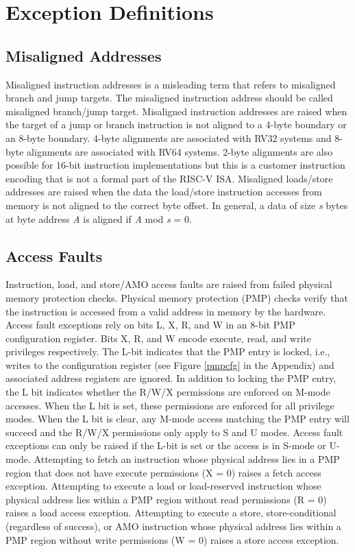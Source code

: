 \documentclass[12pt]{article}
\begin{document}
\section{Exception Definitions}
\subsection{Misaligned Addresses}
Misaligned instruction addresses is a misleading term that refers to misaligned branch and jump targets. The misaligned instruction address should be called misaligned branch/jump target. Misaligned instruction addresses are raised when the target of a jump or branch instruction is not aligned to a 4-byte boundary or an 8-byte boundary. 4-byte alignments are associated with RV32 systems and 8-byte alignments are associated with RV64 systems. 2-byte alignments are also possible for 16-bit instruction implementations but this is a customer instruction encoding that is not a formal part of the RISC-V ISA. Misaligned loads/store addresses are raised when the data the load/store instruction accesses from memory is not aligned to the correct byte offset. In general, a data of size \emph{s} bytes at byte address \emph{A} is aligned if \emph{A} mod \emph{s} = 0.

\subsection{Access Faults}
Instruction, load, and store/AMO access faults are raised from failed physical memory protection checks. Physical memory protection (PMP) checks verify that the instruction is accessed from a valid address in memory by the hardware. Access fault exceptions rely on bits L, X, R, and W in an 8-bit PMP configuration register. Bits X, R, and W encode execute, read, and write privileges respectively. The L-bit indicates that the PMP entry is locked, i.e., writes to the configuration register (see Figure \ref{pmpcfg} in the Appendix) and associated address registers are ignored. In addition to locking the PMP entry, the L bit indicates whether the R/W/X permissions are enforced on M-mode accesses. When the L bit is set, these permissions are enforced for all privilege modes. When the L bit is clear, any M-mode access matching the PMP entry will succeed and the R/W/X permissions only apply to S and U modes. Access fault exceptions can only be raised if the L-bit is set or the access is in S-mode or U-mode. Attempting to fetch an instruction whose physical address lies in a PMP region that does not have execute permissions (X = 0) raises a fetch access exception. Attempting to execute a load or load-reserved instruction whose physical address lies within a PMP region without read permissions (R = 0) raises a load access exception. Attempting to execute a store, store-conditional (regardless of success), or AMO instruction whose physical address lies within a PMP region without write permissions (W = 0) raises a store access exception.
\end{document}
